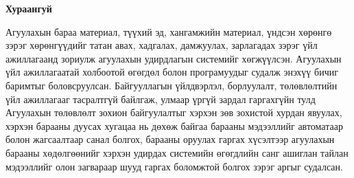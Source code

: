 

\begin{center}
{\scshape\Large \univname\par} %
{\scshape\large \facname\par}\vspace{0.5cm} %
{\huge\textbf{{Хураангуй}} \par}
\bigskip
{\Large{\ttitle} \par} %
\bigskip

{\normalsize \shortname \par} %
\addressname
\end{center}
\bigskip
\qquad Агуулахын бараа материал, түүхий эд, хангамжийн материал, үндсэн
хөрөнгө зэрэг хөрөнгүүдийг татан авах, хадгалах, дамжуулах, зарлагадах зэрэг үйл ажиллагаанд зориулж агуулахын удирдлагын системийг хөгжүүлсэн. Агуулахын үйл ажиллагаатай холбоотой өгөгдөл болон програмуудыг судалж энэхүү бичиг баримтыг боловсруулсан. Байгууллагын үйлдвэрлэл, борлуулалт, төлөвлөлтийн үйл ажиллагааг тасралтгүй байлгаж, улмаар үргүй зардал гаргахгүйн тулд Агуулахын төлөвлөлт зохион байгуулалтыг хэрхэн зөв зохистой хурдан явуулах, хэрхэн барааны  дуусах хугацаа нь дөхөж байгаа барааны мэдээллийг автоматаар болон жагсаалтаар санал болгох, барааны оруулах гаргах хүсэлтээр агуулахын барааны хөдөлгөөнийг хэрхэн удирдах системийн өгөгдлийн санг ашиглан тайлан мэдээллийг олон загвараар шууд гаргах боломжтой болгох зэрэг аргыг судалсан.



